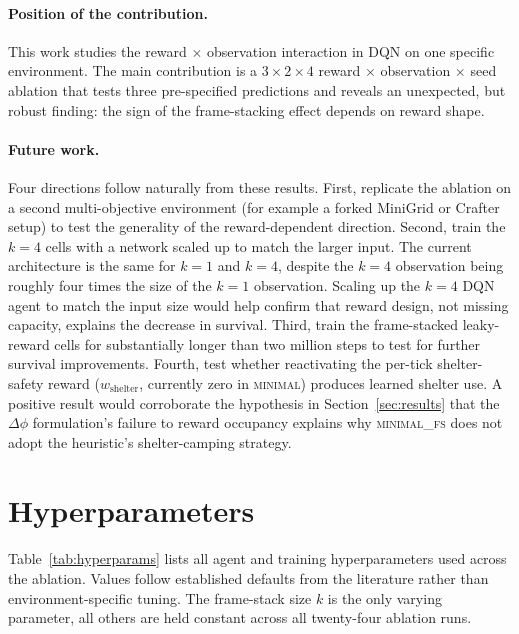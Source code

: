 \documentclass[12pt,a4paper,titlepage]{article}
\begin{document}
\paragraph{Position of the contribution.}
This work studies the reward $\times$ observation interaction in DQN on one specific environment. The main contribution is a $3 \times 2 \times 4$ reward $\times$ observation $\times$ seed ablation that tests three pre-specified predictions and reveals an unexpected, but robust finding: the sign of the frame-stacking effect depends on reward shape.

\paragraph{Future work.}
\label{sec:future_work}
Four directions follow naturally from these results. First, replicate the ablation on a second multi-objective environment (for example a forked MiniGrid or Crafter setup) to test the generality of the reward-dependent direction. Second, train the $k=4$ cells with a network scaled up to match the larger input. The current architecture is the same for $k=1$ and $k=4$, despite the $k=4$ observation being roughly four times the size of the $k=1$ observation. Scaling up the $k=4$ DQN agent to match the input size would help confirm that reward design, not missing capacity, explains the decrease in survival. Third, train the frame-stacked leaky-reward cells for substantially longer than two million steps to test for further survival improvements. Fourth, test whether reactivating the per-tick shelter-safety reward ($w_\text{shelter}$, currently zero in \textsc{minimal}) produces learned shelter use. A positive result would corroborate the hypothesis in Section~\ref{sec:results} that the $\Delta\phi$ formulation's failure to reward occupancy explains why \textsc{minimal\_fs} does not adopt the heuristic's shelter-camping strategy.

\newpage
\appendix

\section{Hyperparameters}
\label{app:hyperparams}

Table~\ref{tab:hyperparams} lists all agent and training hyperparameters used across the ablation. Values follow established defaults from the literature rather than environment-specific tuning. The frame-stack size $k$ is the only varying parameter, all others are held constant across all twenty-four ablation runs.
\end{document}
